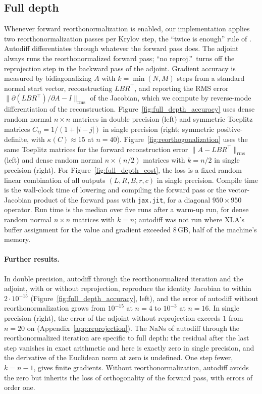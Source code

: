 \documentclass[a4paper,12pt]{article}
\theoremstyle{definition}
\begin{document}
\subsection{Full depth}\label{app:full_depth_setup}
Whenever forward reorthonormalization is enabled, our implementation applies two reorthonormalization passes per Krylov step, the ``twice is enough'' rule of \citet{golub2013matrix}. Autodiff differentiates through whatever the forward pass does. The adjoint always runs the reorthonormalized forward pass; ``no reproj.''\ turns off the reprojection step in the backward pass of the adjoint. Gradient accuracy is measured by bidiagonalizing $A$ with $k = \min(N, M)$ steps from a standard normal start vector, reconstructing $LBR^\top$, and reporting the RMS error $\|\partial(LBR^\top)/\partial A - I\|_{\mathrm{rms}}$ of the Jacobian, which we compute by reverse-mode differentiation of the reconstruction. Figure~\ref{fig:full_depth_accuracy} uses dense random normal $n \times n$ matrices in double precision (left) and symmetric Toeplitz matrices $C_{ij} = 1/(1 + |i - j|)$ in single precision (right; symmetric positive-definite, with $\kappa(C) \approx 15$ at $n = 40$). Figure~\ref{fig:reorthogonalization} uses the same Toeplitz matrices for the forward reconstruction error $\|A - LBR^\top\|_{\mathrm{rms}}$ (left) and dense random normal $n \times (n/2)$ matrices with $k = n/2$ in single precision (right). For Figure~\ref{fig:full_depth_cost}, the loss is a fixed random linear combination of all outputs $(L, R, B, r, c)$ in single precision. Compile time is the wall-clock time of lowering and compiling the forward pass or the vector-Jacobian product of the forward pass with \texttt{jax.jit}, for a diagonal $950 \times 950$ operator. Run time is the median over five runs after a warm-up run, for dense random normal $n \times n$ matrices with $k = n$; autodiff was not run where XLA's buffer assignment for the value and gradient exceeded 8\,GB, half of the machine's memory.

\paragraph{Further results.}
In double precision, autodiff through the reorthonormalized iteration and the adjoint, with or without reprojection, reproduce the identity Jacobian to within $2 \cdot 10^{-15}$ (Figure~\ref{fig:full_depth_accuracy}, left), and the error of autodiff without reorthonormalization grows from $10^{-15}$ at $n = 4$ to $10^{-3}$ at $n = 16$. In single precision (right), the error of the adjoint without reprojection exceeds $1$ from $n = 20$ on (Appendix~\ref{app:reprojection}). The NaNs of autodiff through the reorthonormalized iteration are specific to full depth: the residual after the last step vanishes in exact arithmetic and here is exactly zero in single precision, and the derivative of the Euclidean norm at zero is undefined. One step fewer, $k = n - 1$, gives finite gradients. Without reorthonormalization, autodiff avoids the zero but inherits the loss of orthogonality of the forward pass, with errors of order one.
\end{document}
